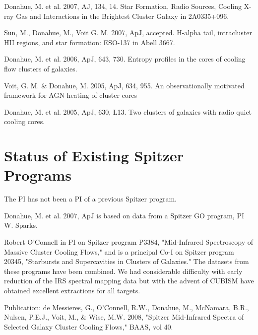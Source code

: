 \documentclass[letterpaper,12pt]{article}
\begin{document}
Donahue, M. et al. 2007, AJ, 134, 14. Star Formation, Radio Sources, Cooling X-ray Gas
and Interactions in the Brightest Cluster Galaxy in 2A0335+096.

Sun, M., Donahue, M., Voit G. M. 2007, ApJ, accepted. H-alpha tail, intracluster HII regions,
and star formation: ESO-137 in Abell 3667.

Donahue, M. et al. 2006, ApJ, 643, 730. Entropy profiles in the cores of cooling flow 
clusters of galaxies.

Voit, G. M. \& Donahue, M. 2005, ApJ, 634, 955. An observationally motivated framework
for AGN heating of cluster cores

Donahue, M. et al. 2005, ApJ, 630, L13. Two clusters of galaxies with radio quiet cooling cores.




\section{Status of Existing Spitzer Programs}

The PI has not been a PI of a previous Spitzer program.

Donahue, M. et al. 2007, ApJ is based on data from a Spitzer GO program, PI W. Sparks.

Robert O'Connell in PI on Spitzer program P3384, "Mid-Infrared
Spectroscopy of Massive Cluster Cooling Flows," and is a principal Co-I
on Spitzer program 20345, "Starbursts and Supercavities in Clusters of
Galaxies."  The datasets from these programs have been combined.  We
had considerable difficulty with early reduction of the IRS spectral
mapping data but with the advent of CUBISM have obtained excellent
extractions for all targets.  

Publication: de Messieres, G., O'Connell, R.W., Donahue, M., McNamara,
B.R., Nulsen, P.E.J., Voit, M., \& Wise, M.W. 2008, "Spitzer
Mid-Infrared Spectra of Selected Galaxy Cluster Cooling Flows," BAAS,
vol 40. 
\end{document}
